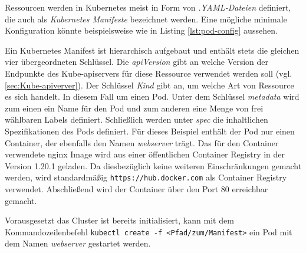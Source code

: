 \documentclass[11pt,a4paper]{article}
\begin{document}
Ressourcen werden in Kubernetes meist in Form von \emph{.YAML-Dateien} definiert, 
die auch als \emph{Kubernetes Manifeste} bezeichnet werden.
Eine mögliche minimale Konfiguration könnte beispielsweise wie in Listing \ref{lst:pod-config} aussehen.



Ein Kubernetes Manifest ist hierarchisch aufgebaut
und enthält stets die gleichen vier übergeordneten Schlüssel.
Die \emph{apiVersion} gibt an welche Version der Endpunkte des Kube-apiservers für diese Ressource
verwendet werden soll (vgl. \ref{sec:Kube-apiverver}).
Der Schlüssel \emph{Kind} gibt an, um welche Art von Ressource es sich handelt.
In diesem Fall um einen Pod.
Unter dem Schlüssel \emph{metadata} wird zum einen ein Name für den Pod
und zum anderen eine Menge von frei wählbaren Labels definiert.
Schließlich werden unter \emph{spec} die inhaltlichen Spezifikationen des Pods
definiert. Für dieses Beispiel enthält der Pod nur einen Container, der ebenfalls den Namen
\emph{webserver} trägt. Das für den Container verwendete nginx Image \cite{nginx} wird aus einer
öffentlichen Container Registry in der Version 1.20.1 geladen. Da diesbezüglich keine weiteren
Einschränkungen gemacht werden, wird standardmäßig \linebreak \lstinline|https://hub.docker.com| als Container Registry
verwendet. Abschließend wird der Container über den Port 80 erreichbar gemacht. \cite{Schmeling_Dargatz_2022}

Vorausgesetzt das Cluster ist bereits initialisiert, kann mit dem Kommandozeilenbefehl
\lstinline|kubectl create -f <Pfad/zum/Manifest>|
ein Pod mit dem Namen \emph{webserver} gestartet werden.
\end{document}

